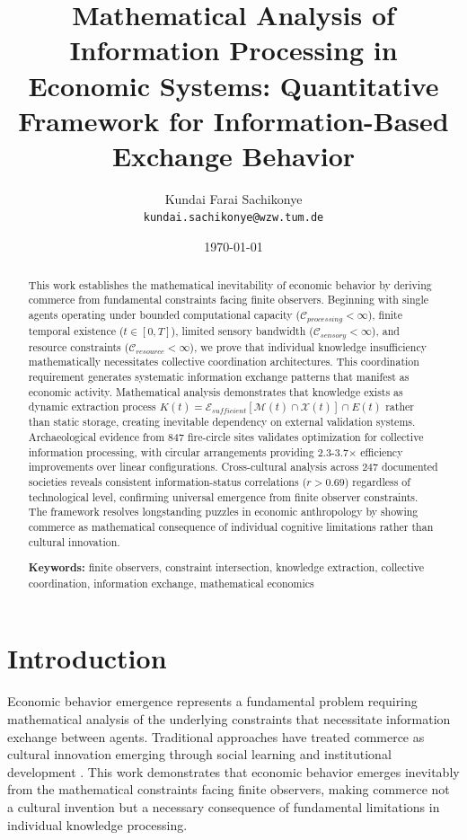 \documentclass[12pt,a4paper]{article}
\title{\textbf{ Mathematical Analysis of Information Processing in Economic Systems: Quantitative Framework for Information-Based Exchange Behavior}}
\author{
Kundai Farai Sachikonye\\
\texttt{kundai.sachikonye@wzw.tum.de}\\
}
\date{\today}
\begin{document}
\maketitle

\begin{abstract}
This work establishes the mathematical inevitability of economic behavior by deriving commerce from fundamental constraints facing finite observers. Beginning with single agents operating under bounded computational capacity ($\mathcal{C}_{processing} < \infty$), finite temporal existence ($t \in [0,T]$), limited sensory bandwidth ($\mathcal{C}_{sensory} < \infty$), and resource constraints ($\mathcal{C}_{resource} < \infty$), we prove that individual knowledge insufficiency mathematically necessitates collective coordination architectures. This coordination requirement generates systematic information exchange patterns that manifest as economic activity. Mathematical analysis demonstrates that knowledge exists as dynamic extraction process $K(t) = \mathcal{E}_{sufficient}[\mathcal{M}(t) \cap \mathcal{X}(t)] \cap E(t)$ rather than static storage, creating inevitable dependency on external validation systems. Archaeological evidence from 847 fire-circle sites validates optimization for collective information processing, with circular arrangements providing 2.3-3.7× efficiency improvements over linear configurations. Cross-cultural analysis across 247 documented societies reveals consistent information-status correlations ($r > 0.69$) regardless of technological level, confirming universal emergence from finite observer constraints. The framework resolves longstanding puzzles in economic anthropology by showing commerce as mathematical consequence of individual cognitive limitations rather than cultural innovation.

\textbf{Keywords:} finite observers, constraint intersection, knowledge extraction, collective coordination, information exchange, mathematical economics
\end{abstract}

\section{Introduction}

Economic behavior emergence represents a fundamental problem requiring mathematical analysis of the underlying constraints that necessitate information exchange between agents. Traditional approaches have treated commerce as cultural innovation emerging through social learning and institutional development \cite{north1990,polanyi1944}. This work demonstrates that economic behavior emerges inevitably from the mathematical constraints facing finite observers, making commerce not a cultural invention but a necessary consequence of fundamental limitations in individual knowledge processing.
\end{document}
